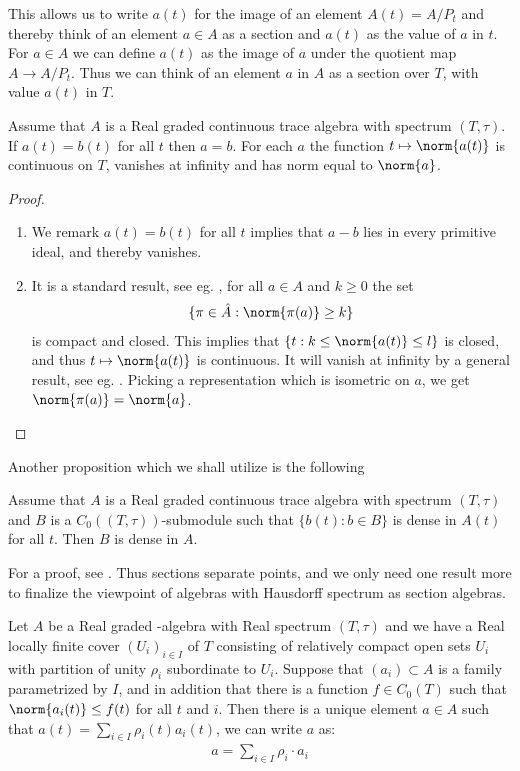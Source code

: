 \noindent This allows us to write $a(t)$ for the image of an element  $A(t)=A/P_t$ and thereby think of an element $a\in A$ as a section and $a(t)$ as the value of $a$ in $t$. 
For $a\in A$ we can define $a(t)$ as the image of $a$ under the quotient map $A\to A/P_t$. Thus we can think of an element $a$ in $A$ as a section over $T$, with value $a(t)$ in $T$.  


\begin{lemma}\label{raeburnlemmaX}
	Assume that $A$ is a Real graded continuous trace \Cstar algebra with spectrum $(T,\tau)$. If $a(t)=b(t)$ for all $t$ then $a=b$. For each $a$ the function $t\mapsto \norm{a(t)}$ is continuous on $T$, vanishes at infinity and has norm equal to $\norm{a}$. 
\end{lemma}
\begin{proof}
	\begin{enumerate}
	\item
		We remark $a(t)=b(t)$ for all $t$ implies that $a-b$ lies in every primitive ideal, and thereby vanishes. 
	\item
		It is a standard result, see eg. \cite[Lemma A.30]{raeburncont}, for all $a\in A$ and $k\geq 0$ the set
		\begin{align*}
			\{\pi\in \hat{A} : \norm{\pi(a)} \geq k\}
		\end{align*}
		is compact and closed. This implies that $\{t: k\leq \norm{a(t)}\leq l\}$ is closed, and thus $t\mapsto \norm{a(t)}$ is continuous. It will vanish at infinity by a general result, see eg. \cite[Lemma A.30(b)]{raeburncont}. Picking a representation which is isometric on $a$, we get ${\norm{\pi(a)}=\norm{a}}$. 
	\end{enumerate}
\end{proof}
Another proposition which we shall utilize is the following
\begin{proposition}\label{raeburn53} 
	Assume that $A$ is a Real graded continuous trace algebra with spectrum $(T,\tau)$ and $B$ is a \Cstar $C_0((T,\tau))$-submodule such that $\{b(t):b\in B\}$ is dense in $A(t)$ for all $t$. Then $B$ is dense in $A$.
\end{proposition}
For a proof, see \cite[Lemma 5.3]{raeburncont}. 
Thus sections separate points, and we only need one result more to finalize the viewpoint of algebras with Hausdorff spectrum as section algebras. 
\begin{lemma}\label{partition}
	Let $A$ be a Real graded \Cstar-algebra with Real spectrum $(T,\tau)$ and we have a Real locally finite cover $(U_i)_{i\in I}$ of $T$ consisting of relatively compact open sets $U_i$ with partition of unity $\rho_i$ subordinate to $U_i$.  Suppose that $(a_i)\subset A$ is a family parametrized by $I$, and in addition that there is a function $f\in C_0(T)$ such that $\norm{a_i(t)}\leq f(t)$ for all $t$ and $i$. Then there is a unique element $a\in A$ such that $a(t)=\sum_{i\in I} \rho_i(t)a_i(t)$, we can write $a$ as: 
	\begin{align*}
		a=\sum_{i\in I} \rho_i\cdot a_i
	\end{align*}
\end{lemma}
